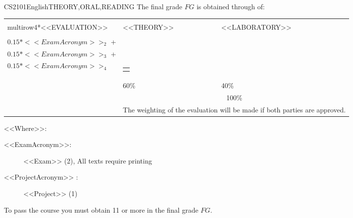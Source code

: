   \begin{evaluation}{CS2101}{English}{THEORY,ORAL,READING}
  The final grade $FG$ is obtained through of:

  \begin{tabularx}{0.9\textwidth}{|X|p{}|p{}|} \hline
    \\multirow{4}{*}{\uppercase{<<Evaluation>>}} & \uppercase{<<Theory>>} & \uppercase{<<Laboratory>>} \\ \cline{2-3}
    & %
        \begin{minipage}{0.95\textwidth}
        \begin{tabular}{l}
            $0.15* <<ExamAcronym>>_{1}$ + \\  
            $0.15* <<ExamAcronym>>_{2}$ + \\ 
            $0.15* <<ExamAcronym>>_{3}$ + \\  
            $0.15* <<ExamAcronym>>_{4}$
        \end{tabular} 
        \end{minipage} 
    & %
        \begin{minipage}{0.95\textwidth}
        \begin{tabular}{l}
            $0.40*<<ProjectAcronym>>_{1}$
            \end{tabular} 
        \end{minipage}                 \\ \cline{2-3}
    
    & %
    60\% 
    & %
    40\% \\ \cline{2-3}
    & \multicolumn{2}{|c|}{100\%}  \\ \cline{2-3}
    & \multicolumn{2}{|c|}{The weighting of the evaluation will be made if both parties are approved.}  \\ \hline
    \end{tabularx}
    
    \vspace{2mm}
    \noindent <<Where>>:
    \begin{description}
        \item[<<ExamAcronym>>:] <<Exam>> (2), All texts require printing
        \item[<<ProjectAcronym>> :] <<Project>> (1)
    \end{description}
  \noindent To pass the course you must obtain 11 or more in the final grade $FG$.
  \end{evaluation}


